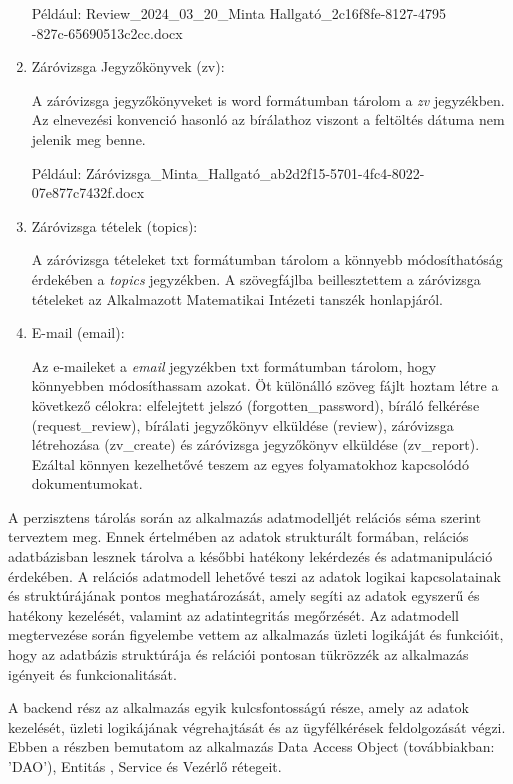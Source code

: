 \begin{enumerate}
\begin{itemize}
\end{itemize}

Például: Review\_2024\_03\_20\_Minta Hallgató\_2c16f8fe-8127-4795\\-827c-65690513c2cc.docx


\item{Záróvizsga Jegyzőkönyvek (zv):}

A záróvizsga jegyzőkönyveket is word formátumban tárolom a \textit{zv} jegyzékben. Az elnevezési konvenció hasonló az bírálathoz viszont a feltöltés dátuma nem jelenik meg benne.

Például: Záróvizsga\_Minta\_Hallgató\_ab2d2f15-5701-4fc4-8022-07e877c7432f.docx

\item{Záróvizsga tételek (topics):}

A záróvizsga tételeket txt formátumban tárolom a könnyebb módosíthatóság érdekében a \textit{topics} jegyzékben. A szövegfájlba beillesztettem a záróvizsga tételeket az Alkalmazott Matematikai Intézeti tanszék honlapjáról. 


\item{E-mail (email):}

Az e-maileket a \textit{email} jegyzékben txt formátumban tárolom, hogy könnyebben módosíthassam azokat. Öt különálló szöveg fájlt hoztam létre a következő célokra: elfelejtett jelszó (forgotten\_password), bíráló felkérése (request\_review), bírálati jegyzőkönyv elküldése (review), záróvizsga létrehozása (zv\_create) és záróvizsga jegyzőkönyv elküldése (zv\_report). Ezáltal könnyen kezelhetővé teszem az egyes folyamatokhoz kapcsolódó dokumentumokat.

\end{enumerate}

A perzisztens tárolás során az alkalmazás adatmodelljét relációs séma szerint terveztem meg. Ennek értelmében az adatok strukturált formában, relációs adatbázisban lesznek tárolva a későbbi hatékony lekérdezés és adatmanipuláció érdekében. A relációs adatmodell lehetővé teszi az adatok logikai kapcsolatainak és struktúrájának pontos meghatározását, amely segíti az adatok egyszerű és hatékony kezelését, valamint az adatintegritás megőrzését. Az adatmodell megtervezése során figyelembe vettem az alkalmazás üzleti logikáját és funkcióit, hogy az adatbázis struktúrája és relációi pontosan tükrözzék az alkalmazás igényeit és funkcionalitását.


A backend rész az alkalmazás egyik kulcsfontosságú része, amely az adatok kezelését, üzleti logikájának végrehajtását és az ügyfélkérések feldolgozását végzi. Ebben a részben bemutatom az alkalmazás Data Access Object (továbbiakban: 'DAO'), Entitás , Service és Vezérlő rétegeit.

